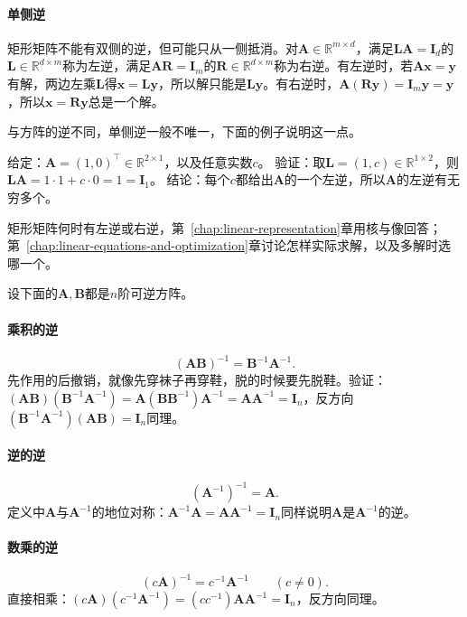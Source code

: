 \paragraph{单侧逆}
矩形矩阵不能有双侧的逆，但可能只从一侧抵消。对$\bm A\in\mathbb R^{m\times d}$，满足$\bm L\bm A=\bm I_d$的$\bm L\in\mathbb R^{d\times m}$称为左逆，满足$\bm A\bm R=\bm I_m$的$\bm R\in\mathbb R^{d\times m}$称为右逆。有左逆时，若$\bm A\bm x=\bm y$有解，两边左乘$\bm L$得$\bm x=\bm L\bm y$，所以解只能是$\bm L\bm y$。有右逆时，$\bm A(\bm R\bm y)=\bm I_m\bm y=\bm y$，所以$\bm x=\bm R\bm y$总是一个解。

与方阵的逆不同，单侧逆一般不唯一，下面的例子说明这一点。
\begin{example}[反例：左逆不唯一]
\label{ex:ls-left-inverse-not-unique}
给定：$\bm A=(1,0)^\top\in\mathbb R^{2\times1}$，以及任意实数$c$。
验证：取$\bm L=(1,c)\in\mathbb R^{1\times2}$，则$\bm L\bm A=1\cdot1+c\cdot0=1=\bm I_1$。
结论：每个$c$都给出$\bm A$的一个左逆，所以$\bm A$的左逆有无穷多个。
\end{example}
矩形矩阵何时有左逆或右逆，第~\ref{chap:linear-representation}章用核与像回答；第~\ref{chap:linear-equations-and-optimization}章讨论怎样实际求解，以及多解时选哪一个。

设下面的$\bm A,\bm B$都是$n$阶可逆方阵。

\paragraph{乘积的逆}
\begin{equation}
 (\bm A\bm B)^{-1}=\bm B^{-1}\bm A^{-1}.
 \label{eq:ls-inverse-product}
\end{equation}
先作用的后撤销，就像先穿袜子再穿鞋，脱的时候要先脱鞋。验证：$(\bm A\bm B)(\bm B^{-1}\bm A^{-1})=\bm A(\bm B\bm B^{-1})\bm A^{-1}=\bm A\bm A^{-1}=\bm I_n$，反方向$(\bm B^{-1}\bm A^{-1})(\bm A\bm B)=\bm I_n$同理。

\paragraph{逆的逆}
\[
 (\bm A^{-1})^{-1}=\bm A.
\]
定义中$\bm A$与$\bm A^{-1}$的地位对称：$\bm A^{-1}\bm A=\bm A\bm A^{-1}=\bm I_n$同样说明$\bm A$是$\bm A^{-1}$的逆。

\paragraph{数乘的逆}
\[
 (c\bm A)^{-1}=c^{-1}\bm A^{-1}\qquad(c\neq0).
\]
直接相乘：$(c\bm A)(c^{-1}\bm A^{-1})=(cc^{-1})\bm A\bm A^{-1}=\bm I_n$，反方向同理。

